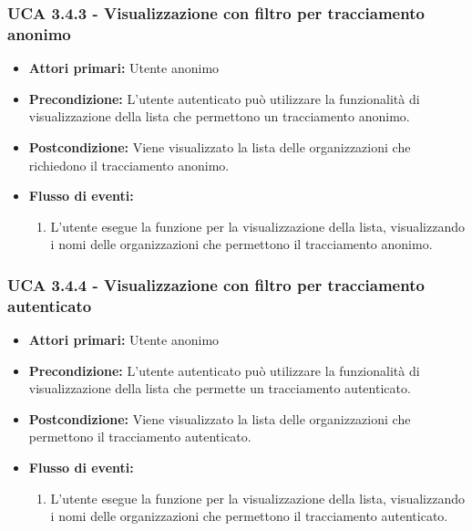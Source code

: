 \subsubsection{UCA 3.4.3 - Visualizzazione con filtro per tracciamento anonimo}%
\begin{itemize}
	\item \textbf{Attori primari:} Utente anonimo
	\item \textbf{Precondizione:} L'utente autenticato può utilizzare la funzionalità di visualizzazione della lista che permettono un tracciamento anonimo.
	\item \textbf{Postcondizione:} Viene visualizzato la lista delle organizzazioni che richiedono il tracciamento anonimo.
	\item \textbf{Flusso di eventi:}
		\begin{enumerate}
		\item L'utente esegue la funzione per la visualizzazione della lista, visualizzando i nomi delle organizzazioni che permettono il tracciamento anonimo.
	\end{enumerate}
\end{itemize}

\subsubsection{UCA 3.4.4 - Visualizzazione con filtro per tracciamento autenticato}%
\begin{itemize}
	\item \textbf{Attori primari:} Utente anonimo
	\item \textbf{Precondizione:} L'utente autenticato può utilizzare la funzionalità di visualizzazione della lista che permette un tracciamento autenticato.
	\item \textbf{Postcondizione:} Viene visualizzato la lista delle organizzazioni che permettono il tracciamento autenticato.
	\item \textbf{Flusso di eventi:}
	\begin{enumerate}
		\item L'utente esegue la funzione per la visualizzazione della lista, visualizzando i nomi delle organizzazioni che permettono il tracciamento autenticato.
	\end{enumerate}
\end{itemize}


